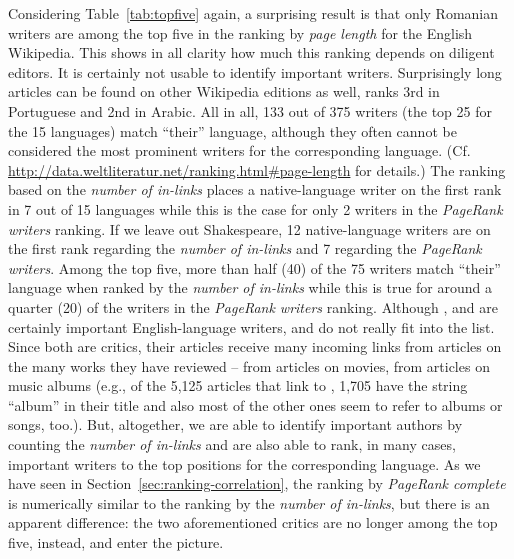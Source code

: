 \documentclass[a4paper,12pt]{scrartcl}
\begin{document}
%
Considering Table~\ref{tab:topfive} again, a surprising result is that
only Romanian writers are among the top five in the ranking by
\emph{page length} for the English Wikipedia. This shows in all
clarity how much this ranking depends on diligent editors. It is
certainly not usable to identify important writers.
%
Surprisingly long articles can be found on other Wikipedia editions as
well, \eg {} ranks 3rd in Portuguese and
 2nd in Arabic.
%
All in all, 133 out of 375 writers (the top 25 for the 15 languages)
match ``their'' language, although they often cannot be considered the
most prominent writers for the corresponding
language. %
(Cf. \url{http://data.weltliteratur.net/ranking.html\#page-length}
  for details.) %
%
The ranking based on the \emph{number of in-links} places a
native-language writer on the first rank in 7 out of 15 languages
while this is the case for only 2 writers in the \emph{PageRank
  writers} ranking. If we leave out Shakespeare, 12 native-language
writers are on the first rank regarding the \emph{number of in-links}
and 7 regarding the \emph{PageRank writers}.  Among the top five, more
than half (40) of the 75 writers match ``their'' language when ranked
by the \emph{number of in-links} while this is true for around a
quarter (20) of the writers in the \emph{PageRank writers} ranking.
%
Although ,  and  are
certainly important English-language writers, 
and  do not really fit into the list.
Since both are critics, their articles receive many incoming
links from articles on the many works they have reviewed --
 from articles on movies,  from
articles on music albums %
(e.g., of the 5,125 articles that
  link to , 1,705 have the string ``album'' in
  their title and also most of the other ones seem to refer to albums
  or songs, too.). %
%
%
%
But, altogether, we are able to identify important authors by counting
the \emph{number of in-links} and are also able to rank, in many
cases, important writers to the top positions for the corresponding
language.
%
As we have seen in Section~\ref{sec:ranking-correlation}, the ranking
by \emph{PageRank complete} is numerically similar to the ranking by
the \emph{number of in-links}, but there is an apparent difference:
the two aforementioned critics are no longer among the top five,
instead,  and  enter the picture.
%
\end{document}
